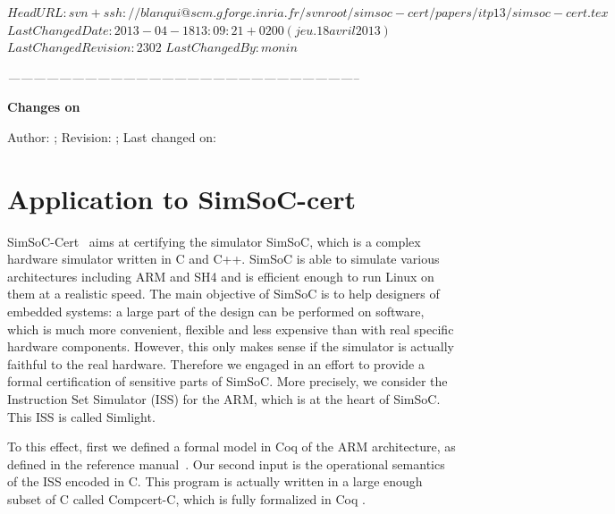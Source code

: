 \svnidlong
{$HeadURL: svn+ssh://blanqui@scm.gforge.inria.fr/svnroot/simsoc-cert/papers/itp13/simsoc-cert.tex $}
{$LastChangedDate: 2013-04-18 13:09:21 +0200 (jeu. 18 avril 2013) $}
{$LastChangedRevision: 2302 $}
{$LastChangedBy: monin $}


\begin{thoughts}
\itshape
\hfil -----------------------------------------------------------------------------------\par
\hfil \textbf{Changes on \currfilename}

Author: \svnfileauthor; Revision: \svnfilerev; Last changed on: \svnfiledate
\end{thoughts}


\section{Application to SimSoC-cert}
\label{sec:simsoccert}

SimSoC-Cert~\cite{rapido11,cpp11} aims at certifying the simulator SimSoC, 
which is a complex hardware simulator written in C and C++.
SimSoC is able to simulate various architectures including ARM and SH4 and is 
efficient enough to run Linux on them at a realistic speed.
The main objective of SimSoC is to help designers of embedded systems:
a large part of the design can be performed on software,
which is much more convenient, flexible and less expensive
than with real specific hardware components.
However, 
this only makes sense if the simulator is actually faithful to the real
hardware.
Therefore we engaged in an effort to provide a formal certification
of sensitive parts of SimSoC.
More precisely, we consider the Instruction Set Simulator (ISS)
for the ARM, which is at the heart of SimSoC.
This ISS is called Simlight.

To this effect, first we defined a formal model in Coq of the ARM architecture,
as defined in the reference manual~\cite{arm6refman}.
Our second input is the operational semantics of the ISS encoded in C. 
This program is actually written in a large enough subset of C
called Compcert-C,
which is fully formalized in Coq \cite{Leroy-Compcert-CACM}.


